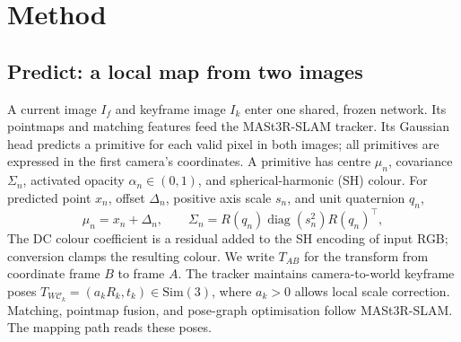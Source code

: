\section{Method}
\label{sec:method}
\subsection{Predict: a local map from two images}
\label{sec:predict}
A current image $I_f$ and keyframe image $I_k$ enter one shared, frozen
network. Its pointmaps and matching features feed the MASt3R-SLAM tracker.
Its Gaussian head predicts a primitive for each valid pixel in both images;
all primitives are expressed in the first camera's coordinates. A primitive
has centre $\mu_n$, covariance $\Sigma_n$, activated opacity
$\alpha_n\in(0,1)$, and spherical-harmonic (SH) colour. For predicted point
$x_n$, offset $\Delta_n$, positive axis scale $s_n$, and unit quaternion $q_n$,
\begin{equation}
  \mu_n=x_n+\Delta_n,\qquad
  \Sigma_n=R(q_n)\operatorname{diag}(s_n^2)R(q_n)^\top ,
  \label{eq:gaussian}
\end{equation}
The DC colour coefficient is a residual added to the SH encoding of input
RGB; conversion clamps the resulting colour.
We write $T_{AB}$ for the transform from coordinate frame $B$ to frame $A$.
The tracker maintains camera-to-world keyframe poses
$T_{W\mathcal C_k}=(a_kR_k,t_k)\in\mathrm{Sim}(3)$, where $a_k>0$ allows
local scale correction. Matching, pointmap fusion, and pose-graph optimisation
follow MASt3R-SLAM. The mapping path reads these poses.

